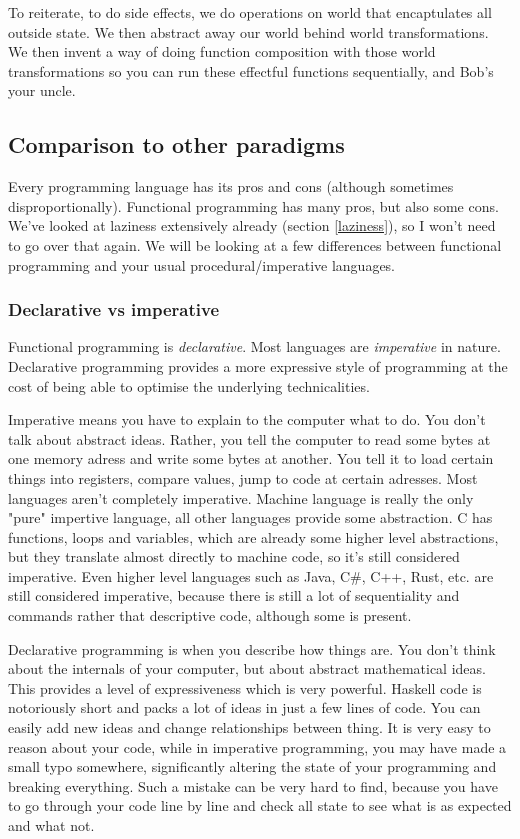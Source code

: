 \documentclass[11pt]{article}
\begin{document}

To reiterate, to do side effects, we do operations on world that encaptulates
all outside state. We then abstract away our world behind world
transformations. We then invent a way of doing function composition with those
world transformations so you can run these effectful functions sequentially,
and Bob's your uncle.

\subsection{Comparison to other paradigms}\label{comparison}

Every programming language has its pros and cons (although sometimes
disproportionally). Functional programming has many pros, but also some cons.
We've looked at laziness extensively already (section \ref{laziness}), so I
won't need to go over that again. We will be looking at a few differences
between functional programming and your usual procedural/imperative languages.

\subsubsection{Declarative vs imperative}

Functional programming is \emph{declarative}. Most languages are
\emph{imperative} in nature. Declarative programming provides a more expressive
style of programming at the cost of being able to optimise the underlying
technicalities.

Imperative means you have to explain to the computer what to do. You don't talk
about abstract ideas. Rather, you tell the computer to read some bytes at one
memory adress and write some bytes at another. You tell it to load certain
things into registers, compare values, jump to code at certain adresses. Most
languages aren't completely imperative. Machine language is really the only
"pure" impertive language, all other languages provide some abstraction. C has
functions, loops and variables, which are already some higher level
abstractions, but they translate almost directly to machine code, so it's still
considered imperative. Even higher level languages such as Java, C\#, C++,
Rust, etc. are still considered imperative, because there is still a lot of
sequentiality and commands rather that descriptive code, although some is
present.

Declarative programming is when you describe how things are. You don't think
about the internals of your computer, but about abstract mathematical ideas.
This provides a level of expressiveness which is very powerful. Haskell code is
notoriously short and packs a lot of ideas in just a few lines of code. You can
easily add new ideas and change relationships between thing. It is very easy to
reason about your code, while in imperative programming, you may have made a
small typo somewhere, significantly altering the state of your programming and
breaking everything. Such a mistake can be very hard to find, because you have
to go through your code line by line and check all state to see what is as
expected and what not.
\end{document}
